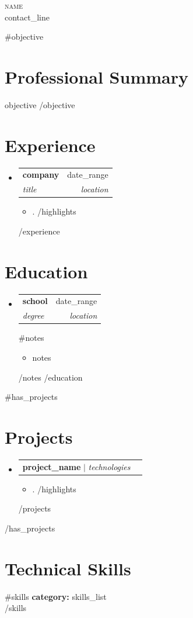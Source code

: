 \documentclass[letterpaper,11pt]{article}
\makeatletter
\newcommand{\resumeItem}[1]{\item\small{{#1 \vspace{-2pt}}}}
\newcommand{\resumeSubheading}[4]{
  \vspace{-4pt}\item
    \begin{tabular*}{0.97\textwidth}[t]{l@{\extracolsep{\fill}}r}
      \textbf{#1} & #2 \\
      \textit{\small#3} & \textit{\small #4} \\
    \end{tabular*}\vspace{-10pt}
}
\newcommand{\resumeEduSubheading}[4]{
  \vspace{2pt}\item
    \begin{tabular*}{0.97\textwidth}[t]{l@{\extracolsep{\fill}}r}
      \textbf{#1} & #2 \\
      \textit{\small#3} & \textit{\small #4} \\
    \end{tabular*}\vspace{-2pt}
}
\newcommand{\resumeProjectHeading}[2]{\item\begin{tabular*}{0.97\textwidth}{l@{\extracolsep{\fill}}r}\small#1 & #2 \\\end{tabular*}\vspace{-7pt}}
\newcommand{\resumeSubHeadingListStart}{\begin{itemize}[leftmargin=0.15in, label={}]}
\newcommand{\resumeSubHeadingListEnd}{\end{itemize}}
\newcommand{\resumeItemListStart}{\begin{itemize}[leftmargin=0.15in]}
\newcommand{\resumeItemListEnd}{\end{itemize}\vspace{-5pt}}
\makeatother
\begin{document}
\begin{center}
  {\Huge \scshape {{name}}}\\\vspace{4pt}
  \small
  {{contact_line}}
\end{center}

{{#objective}}
\section{Professional Summary}
\small{
{{objective}}
}
{{/objective}}

\section{Experience}
\resumeSubHeadingListStart
  {{#experience}}
  \resumeSubheading
    {{{company}}}{{{date_range}}}
    {{{title}}}{{{location}}}
    \resumeItemListStart
      {{#highlights}}
      \resumeItem{{{.}}}
      {{/highlights}}
    \resumeItemListEnd
  {{/experience}}
\resumeSubHeadingListEnd

\section{Education}
\resumeSubHeadingListStart
  {{#education}}
  \resumeEduSubheading
    {{{school}}}{{{date_range}}}
    {{{degree}}}{{{location}}}
    {{#notes}}
    \resumeItemListStart
      \resumeItem{{{notes}}}
    \resumeItemListEnd
    {{/notes}}
  {{/education}}
\resumeSubHeadingListEnd

{{#has_projects}}
\section{Projects}
\resumeSubHeadingListStart
  {{#projects}}
  \resumeProjectHeading{\textbf{{{project_name}}} $\mid$ \emph{{{technologies}}}}{}
  \resumeItemListStart
    {{#highlights}}
    \resumeItem{{{.}}}
    {{/highlights}}
  \resumeItemListEnd
  {{/projects}}
\resumeSubHeadingListEnd
{{/has_projects}}

\section{Technical Skills}
\begin{itemize}[leftmargin=0.15in, label={}]
  \small{\item{
    {{#skills}}
    \textbf{{{category}}:} {{skills_list}} \\
    {{/skills}}
  }}
\end{itemize}
\end{document}
